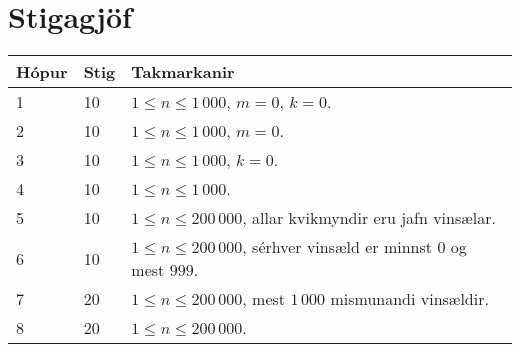 \section*{Stigagjöf}
\begin{tabular}{|l|l|l|}
\hline
Hópur & Stig & Takmarkanir \\ \hline
1     & 10   & $1 \leq n \leq 1\,000$, $m = 0$, $k = 0$. \\ \hline
2     & 10   & $1 \leq n \leq 1\,000$, $m = 0$. \\ \hline
3     & 10   & $1 \leq n \leq 1\,000$, $k = 0$. \\ \hline
4     & 10   & $1 \leq n \leq 1\,000$. \\ \hline
5     & 10   & $1 \leq n \leq 200\,000$, allar kvikmyndir eru jafn vinsælar. \\ \hline
6     & 10   & $1 \leq n \leq 200\,000$, sérhver vinsæld er minnst $0$ og mest $999$. \\ \hline
7     & 20   & $1 \leq n \leq 200\,000$, mest $1\,000$ mismunandi vinsældir. \\ \hline
8     & 20   & $1 \leq n \leq 200\,000$. \\ \hline
\end{tabular}
